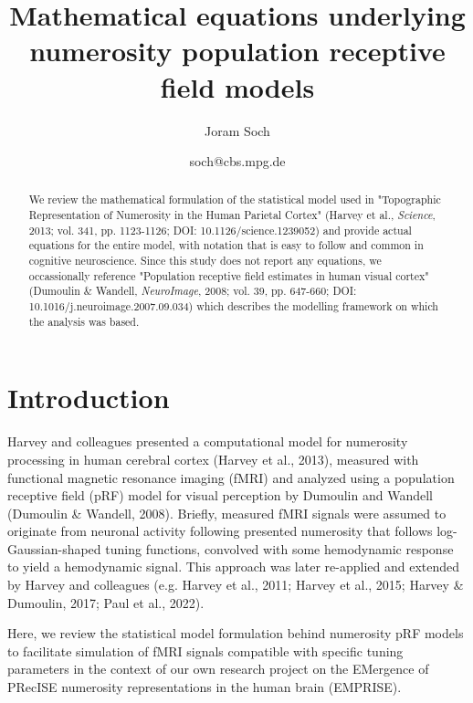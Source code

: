 \documentclass[a4paper,12pt]{article}
\title{Mathematical equations underlying \\ numerosity population receptive field models}
\author{Joram Soch}
\date{soch@cbs.mpg.de}
\begin{document}
	

\setcounter{page}{0}
\maketitle


\begin{abstract}
\noindent
We review the mathematical formulation of the statistical model used in "Topographic Representation of Numerosity in the Human Parietal Cortex" (Harvey et al., \textit{Science}, 2013; vol. 341, pp. 1123-1126; DOI: 10.1126/science.1239052) and provide actual equations for the entire model, with notation that is easy to follow and common in cognitive neuroscience. Since this study does not report any equations, we occassionally reference "Population receptive field estimates in human visual cortex" (Dumoulin \& Wandell, \textit{NeuroImage}, 2008; vol. 39, pp. 647-660; DOI: 10.1016/j.neuroimage.2007.09.034) which describes the modelling framework on which the analysis was based.
\end{abstract}


\vspace{1em}
\tableofcontents


\pagebreak
\section{Introduction} \label{sec:Intro}

Harvey and colleagues presented a computational model for numerosity processing in human cerebral cortex (Harvey et al., 2013), measured with functional magnetic resonance imaging (fMRI) and analyzed using a population receptive field (pRF) model for visual perception by Dumoulin and Wandell (Dumoulin \& Wandell, 2008). Briefly, measured fMRI signals were assumed to originate from neuronal activity following presented numerosity that follows log-Gaussian-shaped tuning functions, convolved with some hemodynamic response to yield a hemodynamic signal. This approach was later re-applied and extended by Harvey and colleagues (e.g. Harvey et al., 2011; Harvey et al., 2015; Harvey \& Dumoulin, 2017; Paul et al., 2022).

Here, we review the statistical model formulation behind numerosity pRF models to facilitate simulation of fMRI signals compatible with specific tuning parameters in the context of our own research project on the EMergence of PRecISE numerosity representations in the human brain (EMPRISE).
\end{document}
